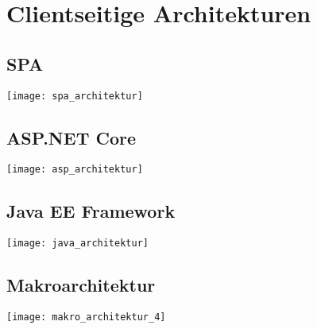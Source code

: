 
\section{Clientseitige Architekturen}
\subsection{SPA}
\texttt{[image: spa\_architektur]}
\subsection{ASP.NET Core}
\texttt{[image: asp\_architektur]}
\subsection{Java EE Framework}
\texttt{[image: java\_architektur]}
\subsection{Makroarchitektur}
\texttt{[image: makro\_architektur\_4]}